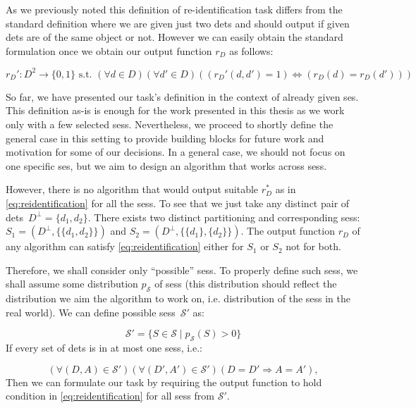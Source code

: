 As we previously noted this definition of re-identification task differs from the standard definition where we are given just two \glspl{det} and should output if given \glspl{det} are of the same object or not. However we can easily obtain the standard formulation once we obtain our output function $r_D$ as follows:

$$
r_D' : D^2 \to \{0, 1\} \text{ s.t. } (\forall d \in D) (\forall d' \in D) ((r_D'(d, d') = 1) \Leftrightarrow (r_D(d) = r_D(d')))
$$

So far, we have presented our task's definition in the context of already given \gls{ses}. This definition as-is is enough for the work presented in this thesis as we work only with a few selected \glspl{ses}. Nevertheless, we proceed to shortly define the general case in this setting to provide building blocks for future work and motivation for some of our decisions. In a general case, we should not focus on one specific \gls{ses}, but we aim to design an algorithm that works across \glspl{ses}.


However, there is no algorithm that would output suitable $r_D^*$ as in \autoref{eq:reidentification} for all the \glspl{ses}. To see that we just take any distinct pair of \glspl{det}~$D^\bot = \{d_1, d_2\}$. There exists two distinct partitioning and corresponding \glspl{ses}: $S_1 = (D^\bot, \{\{d_1, d_2\}\})$ and $S_2 = (D^\bot, \{\{d_1\}, \{d_2\}\})$. The output function $r_D$ of any algorithm can satisfy \autoref{eq:reidentification} either for $S_1$ or $S_2$ not for both.


Therefore, we shall consider only ``possible'' \glspl{ses}. To properly define such \glspl{ses}, we shall assume some distribution $p_\mathcal{S}$ of \glspl{ses} (this distribution should reflect the distribution we aim the algorithm to work on, i.e. distribution of the \glspl{ses} in the real world). We can define possible \glspl{ses}~$\mathcal{S'}$ as:

$$\mathcal{S}' = \{S \in \mathcal{S} \mid p_\mathcal{S}(S) > 0\}$$
If every set of \glspl{det} is in at most one \glspl{ses}, i.e.:

\begin{equation}
    (\forall (D, A) \in \mathcal{S}')(\forall (D', A') \in \mathcal{S}') (D = D' \Rightarrow A = A'),
    \label{eq:uniq_session}
\end{equation}
Then we can formulate our task by requiring the output function to hold
condition in \autoref{eq:reidentification} for all
\glspl{ses} from $\mathcal{S}'$.

